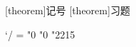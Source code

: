 \renewcommand{\:}{\colon}
\newcommand{\bbC}{\mathbb{C}}
\newcommand{\bbN}{\mathbb{N}}
\newcommand{\bbQ}{\mathbb{Q}}
\newcommand{\bbR}{\mathbb{R}}
\newcommand{\bbZ}{\mathbb{Z}}
\newcommand{\mean}{\operatorname{mean}}
\newcommand{\Mod}{\operatorname{Mod}}
\newcommand{\diff}{\operatorname{diff}}
\newcommand{\stab}{\operatorname{stab}}
\newcommand{\sym}{\operatorname{sym}}
\newcommand{\cut}{\operatorname{cut}}


\AtBeginDocument{
    \let\temp\phi
    \let\phi\varphi
    \let\varphi\temp
    \let\temp\epsilon
    \let\epsilon\varepsilon
    \let\varepsilon\temp
}

\theoremstyle{cjk-definition}
[theorem]{记号}
[theorem]{习题}

\usepackage{enumitem}

\usepackage{cases}
\Umathcode`/ = "0 "0 "2215    %
